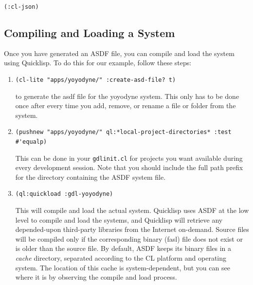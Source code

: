 \documentclass [11pt]{book}
\begin{document}
\begin{verbatim}(:cl-json)
\end{verbatim}



\subsection{Compiling and Loading a System}

\label{subsec:compilingandloadingasystem}

Once you have generated an ASDF file, you can compile and
load the system using Quicklisp. To do this for our example, follow these steps:

\begin{enumerate}

\item 

\begin{verbatim}(cl-lite "apps/yoyodyne/" :create-asd-file? t)
\end{verbatim} to generate the asdf file for the yoyodyne system. This only has to be done once after every time you add, remove, or rename a file or folder from the system.

\item 

\begin{verbatim}(pushnew "apps/yoyodyne/" ql:*local-project-directories* :test #'equalp)
\end{verbatim} This can be done in your \texttt{gdlinit.cl} for projects you want available during every development session. Note that you should include
the full path prefix for the directory containing the ASDF system file.

\item 

\begin{verbatim}(ql:quickload :gdl-yoyodyne)
\end{verbatim} This will compile and load the actual system. Quicklisp
uses ASDF at the low level to compile and load the systems, and
Quicklisp will retrieve any depended-upon third-party libraries from
the Internet on-demand.  Source files will be compiled only if the
corresponding binary (fasl) file does not exist or is older than the
source file. By default, ASDF keeps its binary files in a  \emph{cache} directory, separated according to the CL platform and
operating system. The location of this cache is system-dependent, but
you can see where it is by observing the compile and load
process.

\end{enumerate}
\end{document}
